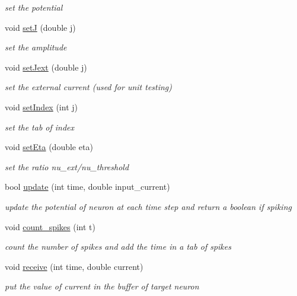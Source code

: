 \begin{DoxyCompactItemize}
\begin{DoxyCompactList}\small\item\em set the potential \end{DoxyCompactList}\item 
void \hyperlink{classNeuron_a475ad67c35d19e414abff5e973ef93f1}{set\-J} (double j)
\begin{DoxyCompactList}\small\item\em set the amplitude \end{DoxyCompactList}\item 
void \hyperlink{classNeuron_a04ceea00a45a58ce3204e431b0f3f894}{set\-Jext} (double j)
\begin{DoxyCompactList}\small\item\em set the external current (used for unit testing) \end{DoxyCompactList}\item 
void \hyperlink{classNeuron_aced1625a25c80371b35bb7eb1aaee62c}{set\-Index} (int j)
\begin{DoxyCompactList}\small\item\em set the tab of index \end{DoxyCompactList}\item 
void \hyperlink{classNeuron_a14ca97731bce04fa5af8f6919e77e83e}{set\-Eta} (double eta)
\begin{DoxyCompactList}\small\item\em set the ratio nu\-\_\-ext/nu\-\_\-threshold \end{DoxyCompactList}\item 
bool \hyperlink{classNeuron_a0fb85de2b3b3ed0c6c01862e5e170576}{update} (int time, double input\-\_\-current)
\begin{DoxyCompactList}\small\item\em update the potential of neuron at each time step and return a boolean if spiking \end{DoxyCompactList}\item 
void \hyperlink{classNeuron_aefea577ee2b365ce4da09c70ad02d657}{count\-\_\-spikes} (int t)
\begin{DoxyCompactList}\small\item\em count the number of spikes and add the time in a tab of spikes \end{DoxyCompactList}\item 
void \hyperlink{classNeuron_a3de570cf533d32de50f7d5728e65f171}{receive} (int time, double current)
\begin{DoxyCompactList}\small\item\em put the value of current in the buffer of target neuron \end{DoxyCompactList}\end{DoxyCompactItemize}


